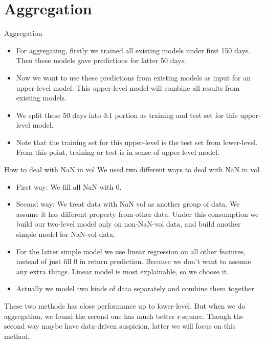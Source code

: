 \documentclass{beamer}
\begin{document}
\section{Aggregation}
\begin{frame}{Aggregation}
\begin{itemize}

\item For aggregating, firstly we trained all existing models under first 150 days. Then these models gave predictions for latter 50 days.

\item Now we want to use these predictions from existing models as input for an upper-level model. This upper-level model will combine all results from existing models. 

\item We split these 50 days into 3:1 portion as training and test set for this upper-level model.

\item Note that the training set for this upper-level is the test set from lower-level. From this point, training or test is in sense of upper-level model.

\end{itemize}
\end{frame}
\begin{frame}{How to deal with NaN in vol}
    We used two different ways to deal with NaN in vol.
    \begin{itemize}
        \item First way: We fill all NaN with 0.
        \item Second way: We treat data with NaN vol as another group of data. We assume it has different property from other data. Under this consumption we build our two-level model only on non-NaN-vol data, and build another simple model for NaN-vol data. 
        \item For the latter simple model we use linear regression on all other features, instead of just fill 0 in return prediction. Because we don't want to assume any extra things. Linear model is most explainable, so we choose it.
        \item Actually we model two kinds of data separately and combine them together
    \end{itemize}
    These two methods has close performance up to lower-level. But when we do aggregation, we found the second one has much better r-square. Though the second way maybe have data-driven suspicion, latter we will focus on this method.
\end{frame}
\end{document}
